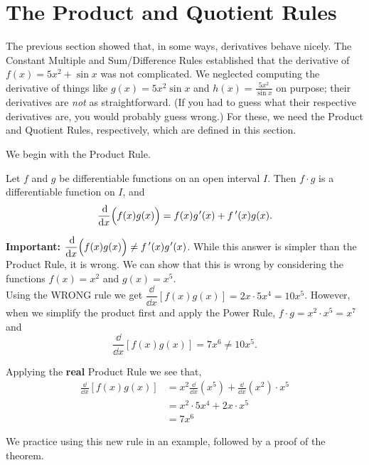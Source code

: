 \section{The Product and Quotient Rules}\label{sec:prod_quot_rules}

The previous section showed that, in some ways, derivatives behave nicely. The Constant Multiple and Sum/Difference Rules established that the derivative of $f(x) = 5x^2+\sin x $ was not complicated. We neglected computing the derivative of things like $g(x) = 5x^2\sin x$ and $h(x) = \frac{5x^2}{\sin x}$ on purpose; their derivatives are \emph{not} as straightforward. (If you had to guess what their respective derivatives are, you would probably guess wrong.) For these, we need the Product and Quotient Rules, respectively, which are defined in this section. 

We begin with the Product Rule.

\begin{theorem}\label{thm:ProductRule}%
Let $f$ and $g$ be differentiable functions on an open interval $I$. Then $f\cdot g$ is a differentiable function on $I$, and
\[\frac{\dd}{\dd x}\Bigl(f(x)g(x)\Bigr) = f(x)g\primeskip'(x) + \fp(x)g(x).\]
\end{theorem}

\textbf{Important:} $\ds\frac{\dd}{\dd x}\Bigl(f(x)g(x)\Bigr) \neq \fp(x)g\primeskip'(x)$. While this answer is simpler than the Product Rule, it is wrong.  We can show that this is wrong by considering the functions
$f(x)=x^2$ and $g(x)=x^5$. \\
Using the WRONG rule we get $\dfrac{\dd}{\dd x}[f(x)g(x)] =2x \cdot 5x^4 = 10x^5$. However, when we simplify the product first and apply the Power Rule, $f \cdot g = x^2 \cdot x^5 = x^7$ and 
\[\frac{\dd}{\dd x}[f(x)g(x)] = 7x^6 \neq 10x^5.\]

Applying the \textbf{real} Product Rule we see that,
\begin{align*}
\frac{\dd}{\dd x}[f(x)g(x)]
& = x^2 \frac{\dd}{\dd x} (x^5) + \frac{\dd}{\dd x} (x^2) \cdot x^5 \\
& = x^2 \cdot 5x^4+2x \cdot x^5 \\
&= 7x^6
\end{align*}


We practice using this new rule in an example, followed by a proof of the theorem.

